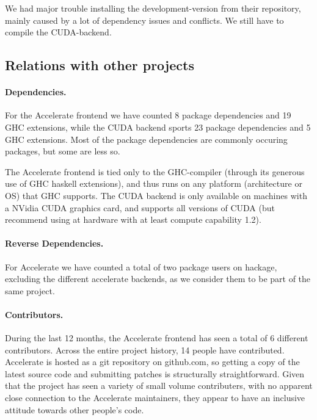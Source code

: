 We had major trouble installing the development-version from their repository,
mainly caused by a lot of dependency issues and conflicts. We still have to
compile the CUDA-backend.  

\subsection{Relations with other projects}

\paragraph{Dependencies.}
For the Accelerate frontend we have counted 8 package dependencies and 19 GHC
extensions, while the CUDA backend sports 23 package dependencies and 5 GHC
extensions.
Most of the package dependencies are commonly occuring packages, but some are
less so. 

The Accelerate frontend is tied only to the GHC-compiler (through its generous
use of GHC haskell extensions), and thus runs on any platform (architecture or
OS) that GHC supports.
The CUDA backend is only available on machines with a NVidia CUDA graphics
card, and supports all versions of CUDA (but recommend using at hardware with
at least compute capability 1.2).

\paragraph{Reverse Dependencies.} For Accelerate we have
counted a total of two package users on hackage, excluding the different
accelerate backends, as we consider them to be part of the same project.

\paragraph{Contributors.} During the last 12 months, the Accelerate
frontend has seen a total of 6 different contributors. Across the entire
project history, 14 people have contributed.
Accelerate is hosted as a git repository on github.com, so getting a copy of
the latest source code and submitting patches is structurally
straightforward.
Given that the project has seen a variety of small volume contributers, with no
apparent close connection to the Accelerate maintainers, they appear to have an
inclusive attitude towards other people's code.

